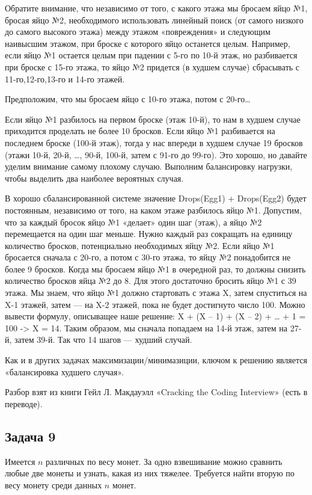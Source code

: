 Обратите внимание, что независимо от того, с какого этажа мы бросаем яйцо №1, бросая яйцо №2, необходимого использовать линейный поиск (от самого низкого до самого высокого этажа) между этажом «повреждения» и следующим наивысшим этажом, при броске с которого яйцо останется целым. Например, если яйцо №1 остается целым при падении с 5-го по 10-й этаж, но разбивается при броске с 15-го этажа, то яйцо №2 придется (в худшем случае) сбрасывать с 11-го,12-го,13-го и 14-го этажей.

Предположим, что мы бросаем яйцо с 10-го этажа, потом с 20-го…

Если яйцо №1 разбилось на первом броске (этаж 10-й), то нам в худшем случае приходится проделать не более 10 бросков.
Если яйцо №1 разбивается на последнем броске (100-й этаж), тогда у нас впереди в худшем случае 19 бросков (этажи 10-й, 20-й, …, 90-й, 100-й, затем с 91-го до 99-го).
Это хорошо, но давайте уделим внимание самому плохому случаю. Выполним балансировку нагрузки, чтобы выделить два наиболее вероятных случая.

В хорошо сбалансированной системе значение Drops(Egg1) + Drops(Egg2) будет постоянным, независимо  от того, на каком этаже разбилось яйцо №1.
Допустим, что за каждый бросок яйцо №1 «делает» один шаг (этаж), а яйцо №2 перемещается на один шаг меньше.
Нужно каждый раз сокращать на единицу количество бросков, потенциально необходимых яйцу №2. Если яйцо №1 бросается сначала с 20-го, а потом с 30-го этажа, то яйцу №2 понадобится не более 9 бросков. Когда мы бросаем яйцо №1 в очередной раз, то должны снизить количество бросков яйца №2 до 8. Для этого достаточно бросить яйцо №1 с 39 этажа.
Мы знаем, что яйцо №1 должно стартовать с этажа X, затем спуститься на X-1 этажей, затем — на X-2 этажей, пока не будет достигнуто число 100.
Можно вывести формулу, описыващее наше решение:  X + (X – 1) + (X – 2) + … + 1 = 100 -> X = 14.
Таким образом, мы сначала попадаем на 14-й этаж, затем на 27-й, затем 39-й. Так что 14 шагов — худший случай.

Как и в других задачах максимизации/минимазиции, ключом к решению является «балансировка худшего случая».

Разбор взят из книги Гейл Л. Макдауэлл «Cracking the Coding Interview» (есть в переводе).

\subsection{Задача 9}

Имеется $n$ различных по весу монет. За одно взвешивание можно сравнить любые
две монеты и узнать, какая из них тяжелее. Требуется найти вторую по весу монету
среди данных $n$ монет.


